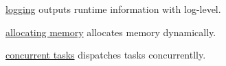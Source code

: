 
\begin{DoxyItemize}
\item \hyperlink{hryky_1_1log}{logging} outputs runtime information with log-\/level.
\end{DoxyItemize}


\begin{DoxyItemize}
\item \hyperlink{hryky_1_1memory}{allocating memory} allocates memory dynamically.
\end{DoxyItemize}


\begin{DoxyItemize}
\item \hyperlink{hryky_1_1task}{concurrent tasks} dispatches tasks concurrentlly. 
\end{DoxyItemize}